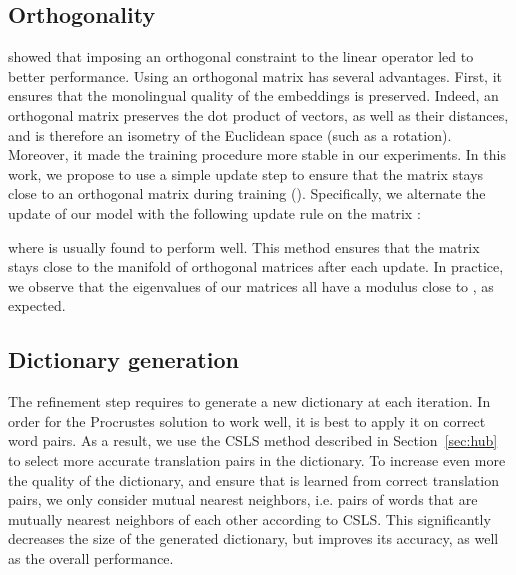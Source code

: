 \documentclass{article} \usepackage{iclr2018_conference,times}
\newcommand{\hub}{CSLS\xspace}
\begin{document}
\subsection{Orthogonality}
\cite{smith2017offline} showed that imposing an orthogonal constraint to the linear operator led to better performance. Using an orthogonal matrix has several advantages. First, it ensures that the monolingual quality of the embeddings is preserved. Indeed, an orthogonal matrix preserves the dot product of vectors, as well as their  distances, and is therefore an isometry of the Euclidean space (such as a rotation). Moreover, it made the training procedure more stable in our experiments.
In this work, we propose to use a simple update step to ensure that the matrix  stays close to an orthogonal matrix during training (\cite{cisse2017parseval}). Specifically, we alternate the update of our model with the following update rule on the matrix :

where  is usually found to perform well. This method ensures that the  matrix stays close to the manifold of orthogonal matrices after each update. In practice, we observe that the eigenvalues of our matrices all have a modulus close to , as  expected.

\subsection{Dictionary generation}
\label{sec:dico_generation}
The refinement step requires to generate a new dictionary at each iteration. In order for the Procrustes solution to work well, it is best to apply it on correct word pairs. As a result, we use the \hub method described in Section~\ref{sec:hub} to select more accurate translation pairs in the dictionary. To increase even more the quality of the dictionary, and ensure that  is learned from correct translation pairs, we only consider mutual nearest neighbors, i.e. pairs of words that are mutually nearest neighbors of each other according to \hub. This significantly decreases the size of the generated dictionary, but improves its accuracy, as well as the overall performance.

\insertmodelselection
\end{document}
